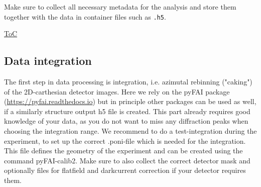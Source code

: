 Make sure to collect all necessary metadata for the analysis and store them together with the data in
container files such as \texttt{.h5}.

\begin{flushright}
    \hyperref[toc]{ToC}
\end{flushright}

\subsection{Data integration}\label{sec:integration}
The first step in data processing is integration, i.e. azimutal rebinning ("caking") of the 2D-carthesian detector images.
Here we rely on the pyFAI package (\url{https://pyfai.readthedocs.io}) but in principle other packages can be used as well,
if a similarly structure output h5 file is created.
This part already requires good knowledge of your data, as you do not want to miss any diffraction peaks when choosing the
integration range. We recommend to do a test-integration during the experiment, to set up the correct
.poni-file which is needed for the integration. This file defines the geometry of the experiment and can be
created using the command pyFAI-calib2. Make sure to also collect the correct detector mask and optionally files
for flatfield and darkcurrent correction if your detector requires them.

